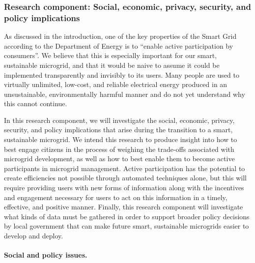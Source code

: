 
\subsubsection{Research component: Social, economic, privacy, security, and policy implications}
\label{sec:social}

As discussed in the introduction, one of the key properties of the Smart
Grid according to the Department of Energy is to ``enable active
participation by consumers''.  We believe that this is especially important
for our smart, sustainable microgrid, and that it would be naive to assume
it could be implemented transparently and invisibly to its users.  Many
people are used to virtually unlimited, low-cost, and reliable electrical
energy produced in an unsustainable, environmentally harmful manner and do
not yet understand why this cannot continue.

In this research component, we will investigate the social, economic,
privacy, security, and policy implications that arise during the transition
to a smart, sustainable microgrid.  We intend this research to produce
insight into how to best engage citizens in the process of weighing the
trade-offs associated with microgrid development, as well as how to best
enable them to become active participants in microgrid management. Active
participation has the potential to create efficiencies not possible through
automated techniques alone, but this will require providing users with new
forms of information along with the incentives and engagement necessary for
users to act on this information in a timely, effective, and positive
manner.  Finally, this research component will investigate what kinds of
data must be gathered in order to support broader policy decisions by local
government that can make future smart, sustainable microgrids easier to
develop and deploy.

\paragraph{Social and policy issues.}

